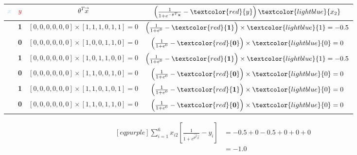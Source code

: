 \begin{table}[H]
	\centering
	\caption{}
	\label{tab:training-2}
	\begin{tabular}{*{4}{|c}|}
		\hline
		\textcolor{lightblue}{$x$} & \textcolor{red}{$y$} & $\theta^{T}\vec{x}$ & $\left( \frac{1}{1 + e^{-\vec{\theta}^{T}\vec{x}} } - \textcolor{red}{y} \right) \textcolor{lightblue}{x_{2}}$\\
		\hline
		[1, 1, 1, 0, 1, 1] & \textbf{1} & $[0, 0, 0, 0, 0, 0] \times [1, 1, 1, 0, 1, 1] = 0$ & $\left( \frac{1}{1 + e^{0}} - \textcolor{red}{\mathbf{1}} \right) \times \textcolor{lightblue}{1} = -0.5$\\
		\hline
		[1, 0, 0, 1, 1, 0] & \textbf{0} & $[0, 0, 0, 0, 0, 0] \times [1, 0, 0, 1, 1, 0] = 0$ & $\left( \frac{1}{1 + e^{0}} - \textcolor{red}{\mathbf{0}} \right) \times \textcolor{lightblue}{0} = 0$\\
		\hline
		[1, 0, 1, 1, 0, 0] & \textbf{1} & $[0, 0, 0, 0, 0, 0] \times [1, 0, 1, 1, 0, 0] = 0$ & $\left( \frac{1}{1 + e^{0}} - \textcolor{red}{\mathbf{1}} \right) \times \textcolor{lightblue}{1} = -0.5$\\
		\hline
		[1, 1, 0, 0, 1, 0] & \textbf{0} & $[0, 0, 0, 0, 0, 0] \times [1, 1, 0, 0, 1, 0] = 0$ & $\left( \frac{1}{1 + e^{0}} - \textcolor{red}{\mathbf{0}} \right) \times \textcolor{lightblue}{0} = 0$\\
		\hline
		[1, 1, 0, 1, 0, 1] & \textbf{1} & $[0, 0, 0, 0, 0, 0] \times [1, 1, 0, 1, 0, 1] = 0$ & $\left( \frac{1}{1 + e^{0}} - \textcolor{red}{\mathbf{1}} \right) \times \textcolor{lightblue}{0} = 0$\\
		\hline
		[1, 1, 0, 1, 1, 0] & \textbf{0} & $[0, 0, 0, 0, 0, 0] \times [1, 1, 0, 1, 1, 0] = 0$ & $\left( \frac{1}{1 + e^{0}} - \textcolor{red}{\mathbf{0}} \right) \times \textcolor{lightblue}{0} = 0$\\
		\hline
	\end{tabular}
\end{table}
\begin{equation*}
\begin{aligned}[eqpurple]
	\sum_{i=1}^6 x_{i2} \left[ \frac{1}{ 1 + e^{\vec{\theta^{T}}\vec{x}}} - y_{i} \right] &= -0.5 + 0 - 0.5 + 0 + 0 + 0 \\
&= -1.0
\end{aligned}
\end{equation*}
